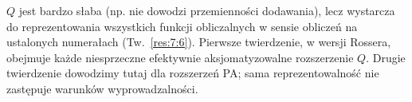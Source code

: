 \begin{uwaga}\label{res:4:11}
$Q$ jest bardzo słaba (np. nie dowodzi przemienności dodawania), lecz wystarcza do reprezentowania wszystkich funkcji obliczalnych w sensie obliczeń na ustalonych numerałach (Tw.~\ref{res:7:6}). Pierwsze twierdzenie, w wersji Rossera, obejmuje każde niesprzeczne efektywnie aksjomatyzowalne rozszerzenie $Q$. Drugie twierdzenie dowodzimy tutaj dla rozszerzeń PA; sama reprezentowalność nie zastępuje warunków wyprowadzalności.
\end{uwaga}

